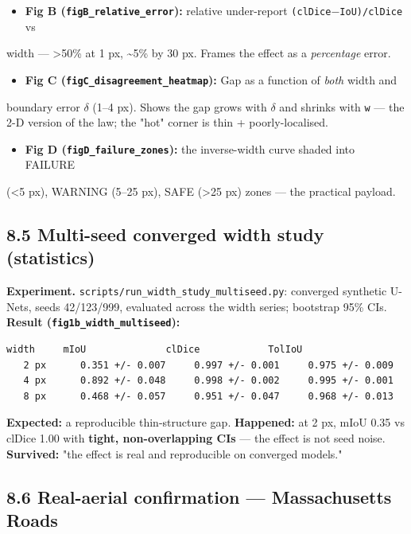 \documentclass[11pt]{article}
\begin{document}
\begin{itemize}\setlength{\itemsep}{1pt}
\item \textbf{Fig B (\texttt{figB\_relative\_error}):} relative under-report \texttt{(clDice$-$IoU)/clDice} vs
\end{itemize}
  width --- >50\% at 1 px, \textasciitilde{}5\% by 30 px. Frames the effect as a \textit{percentage} error.
\begin{itemize}\setlength{\itemsep}{1pt}
\item \textbf{Fig C (\texttt{figC\_disagreement\_heatmap}):} Gap as a function of \textit{both} width and
\end{itemize}
  boundary error \texttt{$\delta$} (1--4 px). Shows the gap grows with \texttt{$\delta$} and shrinks with \texttt{w} --- the   2-D version of the law; the "hot" corner is thin + poorly-localised.
\begin{itemize}\setlength{\itemsep}{1pt}
\item \textbf{Fig D (\texttt{figD\_failure\_zones}):} the inverse-width curve shaded into FAILURE
\end{itemize}
  (<5 px), WARNING (5--25 px), SAFE (>25 px) zones --- the practical payload.

\subsection*{8.5 Multi-seed converged width study (statistics)}

\textbf{Experiment.} \texttt{scripts/run\_width\_study\_multiseed.py}: converged synthetic U-Nets, seeds 42/123/999, evaluated across the width series; bootstrap 95\% CIs. \textbf{Result (\texttt{fig1b\_width\_multiseed}):}
\begin{Verbatim}[breaklines=true,breakanywhere=true,fontsize=\footnotesize]
   width     mIoU              clDice            TolIoU
   2 px      0.351 +/- 0.007     0.997 +/- 0.001     0.975 +/- 0.009
   4 px      0.892 +/- 0.048     0.998 +/- 0.002     0.995 +/- 0.001
   8 px      0.468 +/- 0.057     0.951 +/- 0.047     0.968 +/- 0.013
\end{Verbatim}
\textbf{Expected:} a reproducible thin-structure gap. \textbf{Happened:} at 2 px, mIoU 0.35 vs clDice 1.00 with \textbf{tight, non-overlapping CIs} --- the effect is not seed noise. \textbf{Survived:} "the effect is real and reproducible on converged models."

\subsection*{8.6 Real-aerial confirmation --- Massachusetts Roads}
\end{document}
